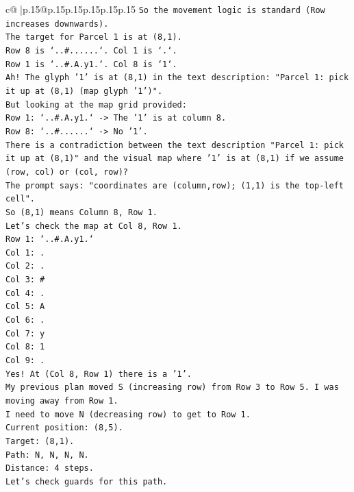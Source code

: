 \documentclass{article}
\begin{document}
{\begin{supertabular}{c@{$\;$}|p{.15\linewidth}@{}p{.15\linewidth}p{.15\linewidth}p{.15\linewidth}p{.15\linewidth}p{.15\linewidth}}
{{{\texttt{So the movement logic is standard (Row increases downwards).} \\
\texttt{The target for Parcel 1 is at (8,1).} \\
\texttt{Row 8 is `..\#......`. Col 1 is `.`.} \\
\texttt{Row 1 is `..\#.A.y1.`. Col 8 is `1`.} \\
\texttt{Ah! The glyph '1' is at (8,1) in the text description: "Parcel 1: pick it up at (8,1) (map glyph '1')".} \\
\texttt{But looking at the map grid provided:} \\
\texttt{Row 1: `..\#.A.y1.` {-}> The '1' is at column 8.} \\
\texttt{Row 8: `..\#......` {-}> No '1'.} \\
\texttt{There is a contradiction between the text description "Parcel 1: pick it up at (8,1)" and the visual map where '1' is at (8,1) if we assume (row, col) or (col, row)?} \\
\texttt{The prompt says: "coordinates are (column,row); (1,1) is the top{-}left cell".} \\
\texttt{So (8,1) means Column 8, Row 1.} \\
\texttt{Let's check the map at Col 8, Row 1.} \\
\texttt{Row 1: `..\#.A.y1.`} \\
\texttt{Col 1: .} \\
\texttt{Col 2: .} \\
\texttt{Col 3: \#} \\
\texttt{Col 4: .} \\
\texttt{Col 5: A} \\
\texttt{Col 6: .} \\
\texttt{Col 7: y} \\
\texttt{Col 8: 1} \\
\texttt{Col 9: .} \\
\texttt{Yes! At (Col 8, Row 1) there is a '1'.} \\
\texttt{My previous plan moved S (increasing row) from Row 3 to Row 5. I was moving away from Row 1.} \\
\texttt{I need to move N (decreasing row) to get to Row 1.} \\
\texttt{Current position: (8,5).} \\
\texttt{Target: (8,1).} \\
\texttt{Path: N, N, N, N.} \\
\texttt{Distance: 4 steps.} \\
\texttt{Let's check guards for this path.} \\
}}}
\end{supertabular}}
\end{document}
